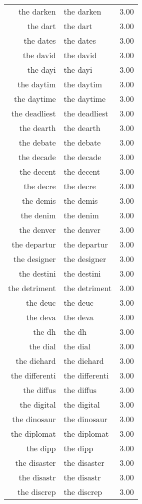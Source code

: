 \begin{table}[ht]
\begin{tabular}{rlr}
  the darken & the darken & 3.00 \\ 
  the dart & the dart & 3.00 \\ 
  the dates & the dates & 3.00 \\ 
  the david & the david & 3.00 \\ 
  the dayi & the dayi & 3.00 \\ 
  the daytim & the daytim & 3.00 \\ 
  the daytime & the daytime & 3.00 \\ 
  the deadliest & the deadliest & 3.00 \\ 
  the dearth & the dearth & 3.00 \\ 
  the debate & the debate & 3.00 \\ 
  the decade & the decade & 3.00 \\ 
  the decent & the decent & 3.00 \\ 
  the decre & the decre & 3.00 \\ 
  the demis & the demis & 3.00 \\ 
  the denim & the denim & 3.00 \\ 
  the denver & the denver & 3.00 \\ 
  the departur & the departur & 3.00 \\ 
  the designer & the designer & 3.00 \\ 
  the destini & the destini & 3.00 \\ 
  the detriment & the detriment & 3.00 \\ 
  the deuc & the deuc & 3.00 \\ 
  the deva & the deva & 3.00 \\ 
  the dh & the dh & 3.00 \\ 
  the dial & the dial & 3.00 \\ 
  the diehard & the diehard & 3.00 \\ 
  the differenti & the differenti & 3.00 \\ 
  the diffus & the diffus & 3.00 \\ 
  the digital & the digital & 3.00 \\ 
  the dinosaur & the dinosaur & 3.00 \\ 
  the diplomat & the diplomat & 3.00 \\ 
  the dipp & the dipp & 3.00 \\ 
  the disaster & the disaster & 3.00 \\ 
  the disastr & the disastr & 3.00 \\ 
  the discrep & the discrep & 3.00 \\ 

\end{tabular}
\end{table}
